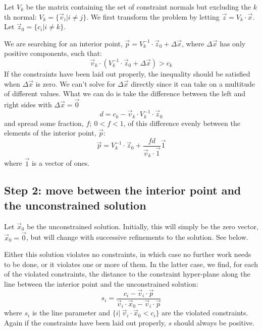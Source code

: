 \documentclass{article}
\begin{document}
Let $V_k$ be the matrix containing the set of constraint normals but
excluding the $k$th normal: $V_k = \lbrace \vec v_i | i \ne j \rbrace$. 
We first transform the problem by letting $\vec z=V_k \cdot \vec x$.
Let $\vec z_0 = \lbrace c_i | i \ne k \rbrace$.

We are searching for an interior point, 
$\vec p = V_k^{-1} \cdot \vec z_0 + \Delta \vec x$, 
where $\Delta \vec x$ has only positive components, such that:
\begin{equation}
	\vec v_k \cdot \left ( V_k^{-1} \cdot \vec z_0 + \Delta \vec x \right ) > c_k
\end{equation}
If the constraints have been laid out properly, the inequality should be 
satisfied when $\Delta \vec x$ is zero.
We can't solve for $\Delta \vec x$ directly since it can take on a 
multitude of different values. What we can do is
take the difference between the left and right sides with $\Delta \vec x = \vec 0$
\begin{equation}
	d = c_k - \vec v_k \cdot V_k^{-1} \cdot \vec z_0
\end{equation}
and spread some fraction, $f;~0 < f < 1$, of this difference evenly between the 
elements of the interior point, $\vec p$:
\begin{equation}
	\vec p = V_k^{-1} \cdot \vec z_0 + \frac{f d}{\vec v_k \cdot \vec 1} \vec 1
\end{equation}
where $\vec 1$ is a vector of ones.

\subsection{Step 2: move between the interior point and the unconstrained solution}

Let $\vec x_0$ be the unconstrained solution. Initially, this will simply be
the zero vector, $\vec x_0 = \vec 0$, but will change with successive 
refinements to the solution. See below. 

Either this solution violates no constraints,
in which case no further work needs to be done, or
it violates one or more of them. In the latter case, we find, for each of the
violated constraints, the distance
to the constraint hyper-plane along the line between the interior point and
the unconstrained solution:
\begin{equation}
	s_i = \frac{c_i - \vec v_i \cdot \vec p}
	{\vec v_i \cdot \vec x_0 - \vec v_i \cdot \vec p}
\end{equation}
where $s_i$ is the line parameter and
$\lbrace i |~\vec v_i \cdot \vec x_0 < c_i \rbrace$ are the violated
constraints. Again if the constraints have been laid out properly, $s$ should
always be positive.
\end{document}
